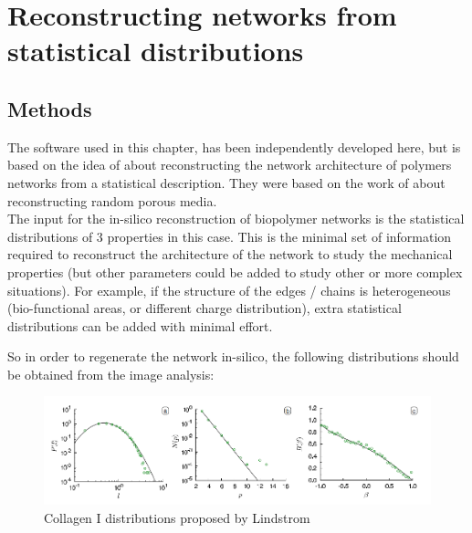 
\chapter{Reconstructing networks from statistical distributions} %

\label{Chapter-Reconstruction} %



\section{Methods}

The software used in this chapter, has been independently developed here, but is based on the
idea of \citet{lindstrom_biopolymer_2010} about reconstructing the network
architecture of polymers networks from a statistical description. They were
based on the work of \citet{yeong_reconstructing_1998,yeong_reconstructing_1998-1}
about reconstructing random porous media.\\
The input for the in-silico reconstruction of biopolymer networks is the
statistical distributions of $3$ properties in this case. This is the minimal
set of information required to reconstruct the architecture of the network to study the
mechanical properties (but other parameters could be added to study other or
more complex situations). For example, if the structure of the edges / chains is
heterogeneous  (bio-functional areas, or different charge distribution), extra
statistical distributions can be added with minimal effort.

So in order to regenerate the network in-silico, the following distributions
should be obtained from the image analysis:
\begin{figure}[h!]
\begin{center}
\includegraphics[width=1.0\textwidth]{Figures/chapter-reconstruct/lindstrom-paper-images.png}

\caption[Collagen distributions]{Collagen I distributions proposed by Lindstrom
\citep{lindstrom_biopolymer_2010}}

\end{center}
\end{figure}


